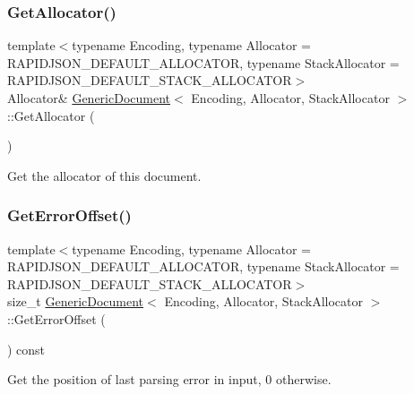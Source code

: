 \subsubsection{\texorpdfstring{Get\+Allocator()}{GetAllocator()}}
{\footnotesize\ttfamily template$<$typename Encoding, typename Allocator = R\+A\+P\+I\+D\+J\+S\+O\+N\+\_\+\+D\+E\+F\+A\+U\+L\+T\+\_\+\+A\+L\+L\+O\+C\+A\+T\+OR, typename Stack\+Allocator = R\+A\+P\+I\+D\+J\+S\+O\+N\+\_\+\+D\+E\+F\+A\+U\+L\+T\+\_\+\+S\+T\+A\+C\+K\+\_\+\+A\+L\+L\+O\+C\+A\+T\+OR$>$ \\
Allocator\& \hyperlink{classGenericDocument}{Generic\+Document}$<$ Encoding, Allocator, Stack\+Allocator $>$\+::Get\+Allocator (\begin{DoxyParamCaption}{ }\end{DoxyParamCaption})\hspace{0.3cm}{\ttfamily [inline]}}



Get the allocator of this document. 

\mbox{\label{classGenericDocument_ae1ef7ca99ced428e9300c68e5142afdb}} 
\subsubsection{\texorpdfstring{Get\+Error\+Offset()}{GetErrorOffset()}}
{\footnotesize\ttfamily template$<$typename Encoding, typename Allocator = R\+A\+P\+I\+D\+J\+S\+O\+N\+\_\+\+D\+E\+F\+A\+U\+L\+T\+\_\+\+A\+L\+L\+O\+C\+A\+T\+OR, typename Stack\+Allocator = R\+A\+P\+I\+D\+J\+S\+O\+N\+\_\+\+D\+E\+F\+A\+U\+L\+T\+\_\+\+S\+T\+A\+C\+K\+\_\+\+A\+L\+L\+O\+C\+A\+T\+OR$>$ \\
size\+\_\+t \hyperlink{classGenericDocument}{Generic\+Document}$<$ Encoding, Allocator, Stack\+Allocator $>$\+::Get\+Error\+Offset (\begin{DoxyParamCaption}{ }\end{DoxyParamCaption}) const\hspace{0.3cm}{\ttfamily [inline]}}



Get the position of last parsing error in input, 0 otherwise. 

\mbox{\label{classGenericDocument_a9400a5bd3169cc6ed545e681ccc06070}} 
